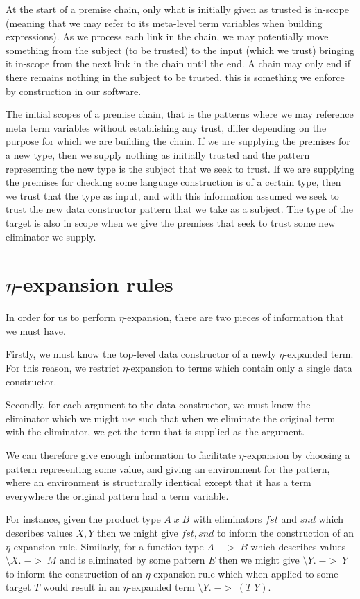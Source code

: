At the start of a premise chain, only what is initially given as
trusted is in-scope (meaning that we may refer to its meta-level term
variables when building expressions). As we process each link in the
chain, we may potentially move something from the subject (to be
trusted) to the input (which we trust) bringing it in-scope from the
next link in the chain until the end. A chain may only end if there
remains nothing in the subject to be trusted, this is something we
enforce by construction in our software.

The initial scopes of a premise chain, that is the patterns where we
may reference meta term variables without establishing any trust,
differ depending on the purpose for which we are building the
chain. If we are supplying the premises for a new type, then we supply
nothing as initially trusted and the pattern representing the new type
is the subject that we seek to trust. If we are supplying the premises
for checking some language construction is of a certain type, then we
trust that the type as input, and with this information assumed we
seek to trust the new data constructor pattern that we take as a
subject. The type of the target is also in scope when we give the
premises that seek to trust some new eliminator we supply.

\section{$\eta$-expansion rules}

In order for us to perform $\eta$-expansion, there are two pieces of
information that we must have.

Firstly, we must know the top-level data constructor of a newly
$\eta$-expanded term. For this reason, we restrict $\eta$-expansion to
terms which contain only a single data constructor.

Secondly, for each argument to the data constructor, we must know the
eliminator which we might use such that when we eliminate the original
term with the eliminator, we get the term that is supplied as the
argument.

We can therefore give enough information to facilitate
$\eta$-expansion by choosing a pattern representing some value, and
giving an environment for the pattern, where an environment is
structurally identical except that it has a term everywhere the
original pattern had a term variable.

For instance, given the product type $A \; x \; B$ with eliminators
$fst$ and $snd$ which describes values $X , Y$ then we might give $fst
, snd$ to inform the construction of an $\eta$-expansion rule. Similarly,
for a function type $A \; -> \; B$ which describes values $\setminus
X. \; -> \; M$ and is eliminated by some pattern $E$ then we might
give $\setminus Y. \; -> \; Y$ to inform the construction of an
$\eta$-expansion rule which when applied to some target $T$ would
result in an $\eta$-expanded term $\setminus Y. \; -> \; (T \; Y)$.

